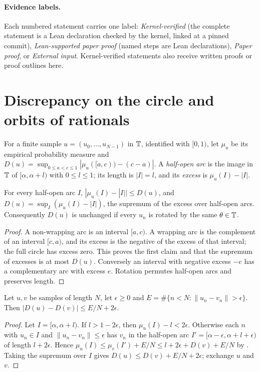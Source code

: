 \documentclass[11pt]{article}
\newcommand{\dist}[1]{\lVert #1\rVert}
\begin{document}
\paragraph{Evidence labels.} Each numbered statement carries one label:
\emph{Kernel-verified} (the complete statement is a Lean declaration checked by the kernel, linked
at a pinned commit), \emph{Lean-supported paper proof} (named steps are Lean declarations),
\emph{Paper proof}, or \emph{External input}. Kernel-verified statements also receive written
proofs or proof outlines here.

\section{Discrepancy on the circle and orbits of rationals}\label{sec:prelim}

For a finite sample $u=(u_0,\ldots,u_{N-1})$ in $\mathbb T$, identified with $[0,1)$, let $\mu_u$ be its
empirical probability measure and $D(u)=\sup_{0\le a<c\le1}|\mu_u([a,c))-(c-a)|$. A
\emph{half-open arc} is the image in $\mathbb T$ of $[\alpha,\alpha+l)$ with $0\le l\le1$; its length is
$|I|=l$, and its \emph{excess} is $\mu_u(I)-|I|$.

\begin{lemma}[Arcs]\label{lem:arcs}
For every half-open arc $I$, $|\mu_u(I)-|I||\le D(u)$, and $D(u)=\sup_I(\mu_u(I)-|I|)$, the supremum
of the excess over half-open arcs. Consequently $D(u)$ is unchanged if every $u_n$ is rotated by
the same $\theta\in\mathbb T$.
\end{lemma}

\begin{proof}
A non-wrapping arc is an interval $[a,c)$. A wrapping arc is the complement of an interval
$[c,a)$, and its excess is the negative of the excess of that interval; the full circle has
excess zero. This proves the first claim and that the supremum of excesses is at most $D(u)$.
Conversely an interval with negative excess $-e$ has a complementary arc with excess $e$.
Rotation permutes half-open arcs and preserves length.
\end{proof}

\begin{lemma}\label{lem:compare}
Let $u,v$ be samples of length $N$, let $\epsilon\ge0$ and $E=\#\{n<N:\dist{u_n-v_n}>\epsilon\}$.
Then $|D(u)-D(v)|\le E/N+2\epsilon$.
\end{lemma}

\begin{proof}
Let $I=[\alpha,\alpha+l)$. If $l>1-2\epsilon$, then $\mu_u(I)-l<2\epsilon$. Otherwise each $n$
with $u_n\in I$ and $\dist{u_n-v_n}\le\epsilon$ has $v_n$ in the half-open arc
$I'=[\alpha-\epsilon,\alpha+l+\epsilon)$ of length $l+2\epsilon$. Hence
$\mu_u(I)\le\mu_v(I')+E/N\le l+2\epsilon+D(v)+E/N$ by . Taking the supremum
over $I$ gives $D(u)\le D(v)+E/N+2\epsilon$; exchange $u$ and $v$.
\end{proof}
\end{document}
